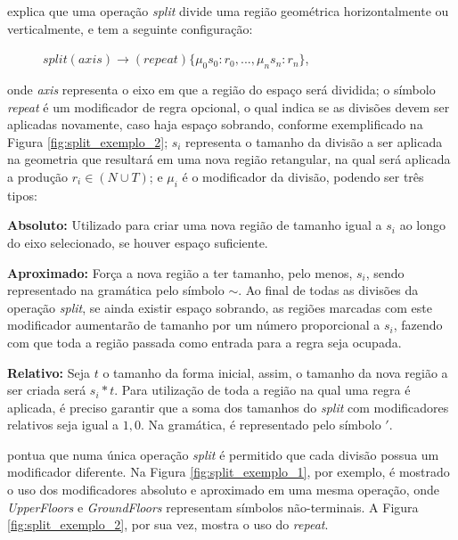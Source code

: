  explica que uma operação \textit{split} divide uma região geométrica horizontalmente ou verticalmente, e tem a seguinte configuração:

\vspace{0.5cm}

\begin{description}
    \item[] \qquad \qquad $split(axis) \rightarrow (repeat)\{\mu_0 s_0 : r_0, ... , \mu_n s_n : r_n \}$,
\end{description}

\vspace{0.5cm}

\noindent onde \textit{axis} representa o eixo em que a região do espaço será dividida; o símbolo \textit{repeat} é um modificador de regra opcional, o qual indica se as divisões devem ser aplicadas novamente, caso haja espaço sobrando, conforme exemplificado na Figura \ref{fig:split_exemplo_2}; $s_i$ representa o tamanho da divisão a ser aplicada na geometria que resultará em uma nova região retangular, na qual será aplicada a produção $r_i \in (N \cup T)$; e $\mu_i$ é o modificador da divisão, podendo ser três tipos:

\textbf{Absoluto:} Utilizado para criar uma nova região de tamanho igual a $s_i$ ao longo do eixo selecionado, se houver espaço suficiente.

\textbf{Aproximado:} Força a nova região a ter tamanho, pelo menos, $s_i$, sendo representado na gramática pelo símbolo $\sim$. Ao final de todas as divisões da operação \textit{split}, se ainda existir espaço sobrando, as regiões marcadas com este modificador aumentarão de tamanho por um número proporcional a $s_i$, fazendo com que toda a região passada como entrada para a regra seja ocupada.

\textbf{Relativo:} Seja $t$ o tamanho da forma inicial, assim, o tamanho da nova região a ser criada será $s_i * t$. Para utilização de toda a região na qual uma regra é aplicada, é preciso garantir que a soma dos tamanhos do \textit{split} com modificadores relativos seja igual a $1,0$. Na gramática, é representado pelo símbolo $'$.

 pontua que numa única operação \textit{split} é permitido que cada divisão possua um modificador diferente. Na Figura \ref{fig:split_exemplo_1}, por exemplo, é mostrado o uso dos modificadores absoluto e aproximado em uma mesma operação, onde \textit{UpperFloors} e \textit{GroundFloors} representam símbolos não-terminais. A Figura \ref{fig:split_exemplo_2}, por sua vez, mostra o uso do \textit{repeat}.

